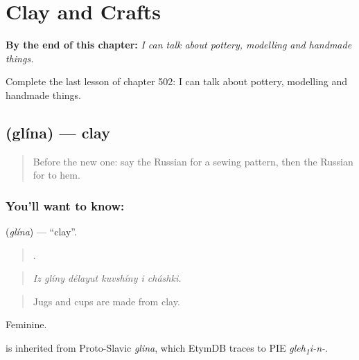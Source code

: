 
\chapter{Clay and Crafts}
\label{ch:ru-clay-and-crafts}

\begin{chapteropening}
\textbf{By the end of this chapter:} \emph{I can talk about pottery, modelling and handmade things.}

Complete the last lesson of chapter 502: I can talk about pottery, modelling and handmade things.
\end{chapteropening}

\section[\texorpdfstring{\ru{глина} (glína)}{глина (glína)}]{ (glína) — clay}

\label{lesson:RU-C502-glina}



\begin{quote}
Before the new one: say the Russian for a sewing pattern, then the Russian for to hem.
\end{quote}

\subsection*{You'll want to know: }
\textbf{} (\emph{glína}) — \textquotedblleft{}clay\textquotedblright{}.

\begin{quote}
     .
\end{quote}

\begin{quote}
\emph{Iz glíny délayut kuvshíny i cháshki.}
\end{quote}

\begin{quote}
Jugs and cups are made from clay.
\end{quote}

Feminine.

\begin{cousinweb}
\emph{} is inherited from Proto-Slavic \emph{glina}, which EtymDB traces to PIE \emph{gleh\textsubscript{1}i-n-}.
\end{cousinweb}

